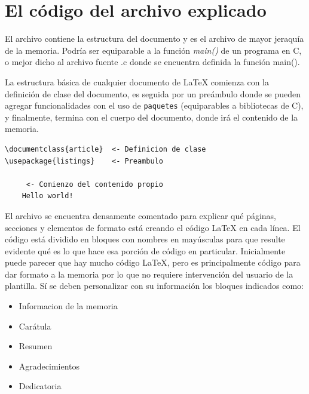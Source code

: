 
\section{El código del archivo  explicado}

El archivo  contiene la estructura del documento y es el archivo de mayor jeraquía de la memoria.  Podría ser equiparable a la función \emph{main()} de un programa en C, o mejor dicho al archivo fuente .c donde se encuentra definida la función main().

La estructura básica de cualquier documento de \LaTeX{} comienza con la definición de clase del documento, es seguida por un preámbulo donde se pueden agregar funcionalidades con el uso de \texttt{paquetes} (equiparables a bibliotecas de C), y finalmente, termina con el cuerpo del documento, donde irá el contenido de la memoria.


\begin{lstlisting}
\documentclass{article}  <- Definicion de clase
\usepackage{listings}	 <- Preambulo

	 <- Comienzo del contenido propio 
	Hello world!

\end{lstlisting}


El archivo  se encuentra densamente comentado para explicar qué páginas, secciones y elementos de formato está creando el código \LaTeX{} en cada línea. El código está dividido en bloques con nombres en mayúsculas para que resulte evidente qué es lo que hace esa porción de código en particular. Inicialmente puede parecer que hay mucho código \LaTeX{}, pero es principalmente código para dar formato a la memoria por lo que no requiere intervención del usuario de la plantilla.  Sí se deben personalizar con su información los bloques indicados como:

\begin{itemize}
	\item Informacion de la memoria
	\item Carátula
	\item Resumen
	\item Agradecimientos
	\item Dedicatoria
\end{itemize}

